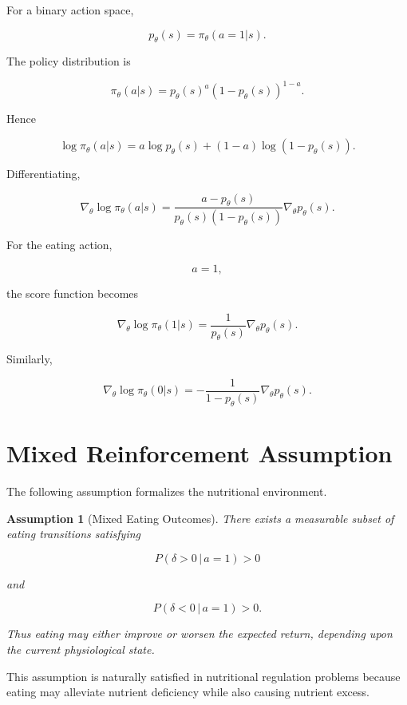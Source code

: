 \documentclass[11pt]{article}
\newtheorem{assumption}{Assumption}
\begin{document}
For a binary action space,

\[
p_\theta(s)
=
\pi_\theta(a=1|s).
\]

The policy distribution is

\[
\pi_\theta(a|s)
=
p_\theta(s)^a
\left(
1-p_\theta(s)
\right)^{1-a}.
\]

Hence

\[
\log\pi_\theta(a|s)
=
a\log p_\theta(s)
+
(1-a)\log(1-p_\theta(s)).
\]

Differentiating,

\[
\nabla_\theta
\log\pi_\theta(a|s)
=
\frac{a-p_\theta(s)}
{p_\theta(s)(1-p_\theta(s))}
\nabla_\theta p_\theta(s).
\]

For the eating action,

\[
a=1,
\]

the score function becomes

\[
\nabla_\theta
\log\pi_\theta(1|s)
=
\frac{1}{p_\theta(s)}
\nabla_\theta p_\theta(s).
\]

Similarly,

\[
\nabla_\theta
\log\pi_\theta(0|s)
=
-
\frac{1}{1-p_\theta(s)}
\nabla_\theta p_\theta(s).
\]


\section{Mixed Reinforcement Assumption}

The following assumption formalizes the nutritional environment.

\begin{assumption}[Mixed Eating Outcomes]

There exists a measurable subset of eating transitions satisfying

\[
P(\delta>0\,|\,a=1)>0
\]

and

\[
P(\delta<0\,|\,a=1)>0.
\]

Thus eating may either improve or worsen the expected return,
depending upon the current physiological state.

\end{assumption}

This assumption is naturally satisfied in nutritional regulation
problems because eating may alleviate nutrient deficiency while also
causing nutrient excess.

\end{document}
